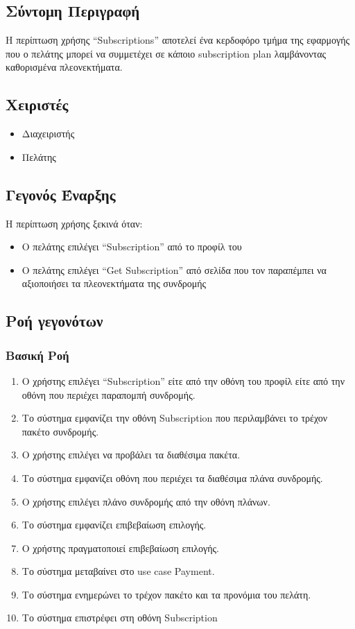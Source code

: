 \documentclass[12pt,a4paper,twoside]{book}
\begin{document}
\subsection{Σύντομη Περιγραφή}
Η περίπτωση χρήσης “Subscriptions” αποτελεί ένα κερδοφόρο τμήμα της εφαρμογής που ο πελάτης μπορεί να συμμετέχει σε κάποιο subscription plan λαμβάνοντας καθορισμένα πλεονεκτήματα. %

\subsection{Χειριστές}
\begin{itemize}
  \item Διαχειριστής
  \item Πελάτης
\end{itemize}

\subsection{Γεγονός Έναρξης}
Η περίπτωση χρήσης ξεκινά όταν:
\begin{itemize}
  \item Ο πελάτης επιλέγει “Subscription” από το προφίλ του   %
  \item Ο πελάτης επιλέγει “Get Subscription” από σελίδα που τον παραπέμπει να αξιοποιήσει τα πλεονεκτήματα της συνδρομής %
\end{itemize}

\subsection{Ροή γεγονότων}

\subsubsection{Βασική Ροή}
\begin{enumerate}
  \item Ο χρήστης επιλέγει “Subscription” είτε από την οθόνη του προφίλ είτε από την οθόνη που περιέχει παραπομπή συνδρομής.  %
  \item Το σύστημα εμφανίζει την οθόνη Subscription που περιλαμβάνει το τρέχον πακέτο συνδρομής. %
  \item Ο χρήστης επιλέγει να προβάλει τα διαθέσιμα πακέτα. %
  \item Το σύστημα εμφανίζει οθόνη που περιέχει τα διαθέσιμα πλάνα συνδρομής. %
  \item Ο χρήστης επιλέγει πλάνο συνδρομής από την οθόνη πλάνων. %
  \item Το σύστημα εμφανίζει επιβεβαίωση επιλογής. %
  \item Ο χρήστης πραγματοποιεί επιβεβαίωση επιλογής. %
  \item Το σύστημα μεταβαίνει στο use case Payment. %
  \item Το σύστημα ενημερώνει το τρέχον πακέτο και τα προνόμια του πελάτη. %
  \item Το σύστημα επιστρέφει στη οθόνη Subscription
\end{enumerate}
\end{document}

